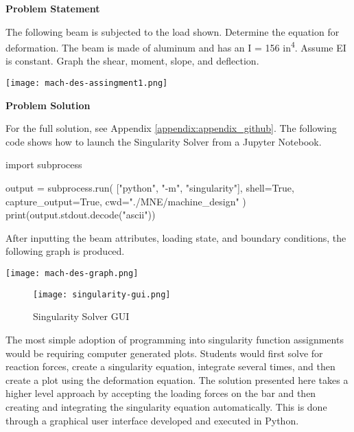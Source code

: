 \begin{tcolorbox}[breakable, enhanced jigsaw, title=ME 533: Assignment \ref{mach_des_assignment_1}, 
    colframe=ksu-purple, colback=ksu-gray]

    \textbf{Problem Statement}
    \parindent15pt

    The following beam is subjected to the load shown. Determine the equation for deformation. 
    The beam is made of aluminum and has an I = 156 in\textsuperscript{4}. Assume EI is constant. Graph 
    the shear, moment, slope, and deflection.

    \begin{center}
        \texttt{[image: mach-des-assingment1.png]}
    \end{center}

    \tcblower
    \textbf{Problem Solution}
    \parindent15pt

    For the full solution, see Appendix \ref{appendix:appendix_github}. The following code shows how to
    launch the Singularity Solver from a Jupyter Notebook.

\begin{python}
import subprocess

output = subprocess.run(
    ["python", "-m", "singularity"], 
    shell=True, 
    capture_output=True,
    cwd="./MNE/machine_design"
)
print(output.stdout.decode("ascii"))
\end{python}

After inputting the beam attributes, loading state, and boundary conditions, the following graph
is produced.

\begin{center}
    \texttt{[image: mach-des-graph.png]}
\end{center}
\end{tcolorbox}

\begin{figure}[h]
    \texttt{[image: singularity-gui.png]}
    \centering
    \caption{Singularity Solver GUI}
    \centering
    \label{fig:singularity-gui}
\end{figure}

The most simple adoption of programming into singularity function assignments would be requiring computer
generated plots. Students would first solve for reaction forces, create a singularity equation, integrate
several times, and then create a plot using the deformation equation. The solution presented here takes a 
higher level approach by accepting the loading forces on the bar and then creating and integrating the 
singularity equation automatically. This is done through a graphical user interface developed and executed
in Python.

